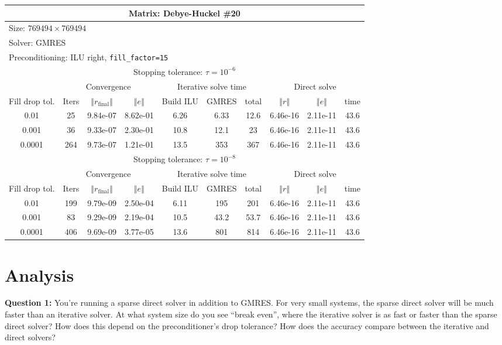 \documentclass[oneside,final]{amsart}  %
\begin{document}
\begin{tabular}{|c|c|c|c|c|c|c|c|c|c|}
\hline
\multicolumn{10}{|c|}{Matrix: Debye-Huckel \#20}\tabularnewline
\hline
  \multicolumn{10}{|l|}{Size: $769494\times769494$}\tabularnewline
\hline
\multicolumn{10}{|l|}{Solver: GMRES}\tabularnewline
\hline
\multicolumn{10}{|l|}{Preconditioning: ILU right, \texttt{fill\_factor=15}}\tabularnewline
\hline
\hline
\multicolumn{10}{|c|}{Stopping tolerance: $\tau=10^{-6}$}\tabularnewline
\hline
\hline
 & \multicolumn{3}{c|}{Convergence} & \multicolumn{3}{c|}{Iterative solve time} & \multicolumn{3}{c|}{Direct solve}\tabularnewline
\hline
Fill drop tol.  & Iters & $\left\Vert r_{\text{final}}\right\Vert $  & $\left\Vert e\right\Vert $  & Build ILU  & GMRES  & total  & $\left\Vert r\right\Vert $ & $\left\Vert e\right\Vert $  & time\tabularnewline
\hline
0.01   & 25  & 9.84e-07 & 8.62e-01 &    6.26 &    6.33 &    12.6 & 6.46e-16 & 2.11e-11 &      43.6\\
  \hline
0.001  & 36  & 9.33e-07 & 2.30e-01 &    10.8 &    12.1 &      23 & 6.46e-16 & 2.11e-11 &      43.6\\
  \hline
0.0001 & 264 & 9.73e-07 & 1.21e-01 &    13.5 &     353 &     367 & 6.46e-16 & 2.11e-11 &      43.6\\
  \hline
\hline
\multicolumn{10}{|c|}{Stopping tolerance: $\tau=10^{-8}$}\tabularnewline
\hline
\hline
 & \multicolumn{3}{c|}{Convergence} & \multicolumn{3}{c|}{Iterative solve time} & \multicolumn{3}{c|}{Direct solve }\tabularnewline
\hline
Fill drop tol.  & Iters  & $\left\Vert r_{\text{final}}\right\Vert $  & $\left\Vert e\right\Vert $ & Build ILU  & GMRES  & total  & $\left\Vert r\right\Vert $  & $\left\Vert e\right\Vert $  & time\tabularnewline
\hline
0.01   & 199 & 9.79e-09 & 2.50e-04 &    6.11 &     195 &     201 & 6.46e-16 & 2.11e-11 &      43.6\\
  \hline
0.001  & 83  & 9.29e-09 & 2.19e-04 &    10.5 &    43.2 &    53.7 & 6.46e-16 & 2.11e-11 &      43.6\\
  \hline
0.0001 & 406 & 9.69e-09 & 3.77e-05 &    13.6 &     801 &     814 & 6.46e-16 & 2.11e-11 &      43.6\\
  \hline
\end{tabular}

\section{Analysis}
\textbf{Question 1: }You're running a sparse direct solver in addition to GMRES.
For very small systems, the sparse direct solver will be much faster than an iterative solver.
At what system size do you see ``break even'', where the iterative solver is as fast or faster than the sparse direct solver?
How does this depend on the preconditioner's drop tolerance?
How does the accuracy compare between the iterative and direct solvers?
\end{document}
